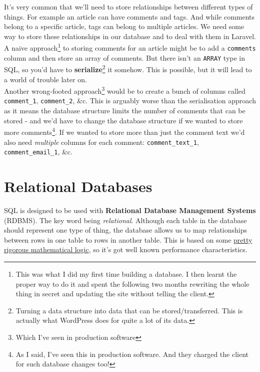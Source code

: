 It's very common that we'll need to store relationships between different types of things. For example an article can have comments and tags. And while comments belong to a specific article, tags can belong to multiple articles. We need some way to store these relationships in our database and to deal with them in Laravel.
\\

A naive approach\footnote{This was what I did my first time building a database. I then learnt the proper way to do it and spent the following two months rewriting the whole thing in secret and updating the site without telling the client.} to storing comments for an article might be to add a \texttt{comments} column and then store an array of comments. But there isn't an \texttt{ARRAY} type in SQL, so you'd have to \textbf{serialize}\footnote{Turning a data structure into data that can be stored/transferred. This is actually what WordPress does for quite a lot of its data.} it somehow. This is possible, but it will lead to a world of trouble later on.
\\

Another wrong-footed approach\footnote{Which I've seen in production software} would be to create a bunch of columns called \texttt{comment\_1}, \texttt{comment\_2}, \&c. This is arguably worse than the serialisation approach as it means the database structure limits the number of comments that can be stored - and we'd have to change the database structure if we wanted to store more comments\footnote{As I said, I've seen this in production software. And they charged the client for such database changes too!}. If we wanted to store more than just the comment text we'd also need \textit{multiple} columns for each comment: \texttt{comment\_text\_1}, \texttt{comment\_email\_1}, \&c.

\pagebreak

\section{Relational Databases}

SQL is designed to be used with \textbf{Relational Database Management Systems} (RDBMS). The key word being \textit{relational}. Although each table in the database should represent one type of thing, the database allows us to map relationships between rows in one table to rows in another table. This is based on some \href{https://en.wikipedia.org/wiki/Relational\_algebra}{pretty rigorous mathematical logic}, so it's got well known performance characteristics.
\\

